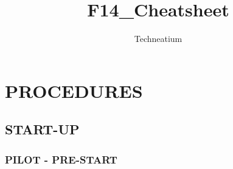 \documentclass[fontSpartan]{TechCheck}
\title{F14_Cheatsheet}
\author{Techneatium}
\begin{document}
	

	\pagestyle{empty}
	\dominitoc
	\tableofcontents
	\cleardoublepage

	\setcounter{page}{1}
	\pagestyle{body}

	\chapter{PROCEDURES}
	\minitoc
	\cleardoublepage

	\section{START-UP}

	\subsection{PILOT - PRE-START}
\end{document}
